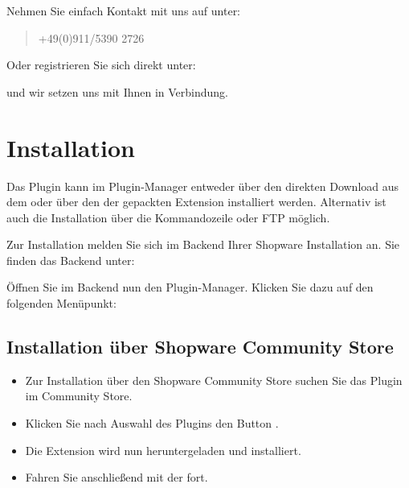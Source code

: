 \documentclass[a4paper,10pt,openany,oneside,ngerman]{sphinxmanual}
\begin{document}
Nehmen Sie einfach Kontakt mit uns auf unter:
\begin{quote}


+49(0)911/5390 2726
\end{quote}

Oder registrieren Sie sich direkt unter:
\begin{quote}

\end{quote}

und wir setzen uns mit Ihnen in Verbindung.


\chapter{Installation}
\label{\detokenize{installation:installation}}\label{\detokenize{installation::doc}}
Das Plugin kann im Plugin-Manager entweder über den direkten Download aus dem  oder über den  der gepackten Extension installiert werden.
Alternativ ist auch die Installation über die Kommandozeile oder FTP möglich.

Zur Installation melden Sie sich im Backend Ihrer Shopware Installation an. Sie finden das Backend unter:
\begin{quote}

\end{quote}

Öffnen Sie im Backend nun den Plugin-Manager. Klicken Sie dazu auf den folgenden Menüpunkt:
\begin{quote}

\end{quote}


\section{Installation über Shopware Community Store}
\label{\detokenize{installation:installation-uber-shopware-community-store}}
\noindent{}
\begin{itemize}
\item {} 
Zur Installation über den Shopware Community Store suchen Sie das Plugin im Community Store.

\item {} 
Klicken Sie nach Auswahl des Plugins den Button .

\item {} 
Die Extension wird nun heruntergeladen und installiert.

\item {} 
Fahren Sie anschließend mit der  fort.

\end{itemize}
\end{document}
